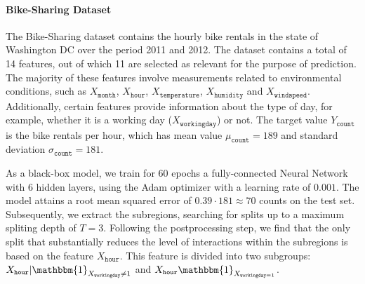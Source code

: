 \documentclass[runningheads]{llncs}
\newcommand{\when}[1]{\mathbbm{1}_{#1}}
\begin{document}
\paragraph{Bike-Sharing Dataset}

The Bike-Sharing dataset contains the hourly bike rentals in the state of Washington DC over the period 2011 and 2012.
The dataset contains a total of 14 features, out of which 11 are selected as relevant for the purpose of prediction.
The majority of these features involve measurements related to environmental conditions,
such as $X_{\mathtt{month}}$, $X_{\mathtt{hour}}$, $X_{\mathtt{temperature}}$, $X_{\mathtt{humidity}}$ and $X_{\mathtt{windspeed}}$.
Additionally, certain features provide information about the type of day, for example, whether it is a working day ($X_{\mathtt{workingday}}$) or not.
The target value \( Y_{\mathtt{count}}\) is the bike rentals per hour, which has mean value
\(\mu_{\mathtt{count}} = 189\) and standard deviation \(\sigma_{\mathtt{count}} = 181\).

As a black-box model, we train for \(60\) epochs a fully-connected Neural Network with 6 hidden layers, using the Adam optimizer with a learning rate of $0.001$.
The model attains a root mean squared error of \( 0.39 \cdot 181 \approx 70\) counts on the test set.
Subsequently, we extract the subregions, searching for splits up to a maximum spliting depth of \(T=3\).
Following the postprocessing step, we find that the only split that substantially reduces the level of interactions within the subregions is based on the feature
$X_{\mathtt{hour}}$. This feature is divided into two subgroups: $X_{\mathtt{hour}} | \when{X_{\mathtt{workingday}} \neq 1}$ and $X_{\mathtt{hour}} \when{X_{\mathtt{workingday} = 1}}$.
\end{document}
